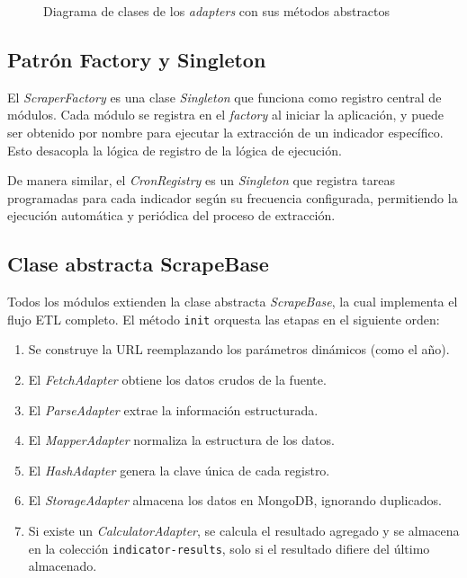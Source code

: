 \documentclass[12pt,letterpaper,oneside]{report}
\begin{document}
\begin{figure}[H]
  \caption{Diagrama de clases de los \textit{adapters} con sus m\'etodos abstractos}
  \label{fig:diagrama-adapters}
\end{figure}

\subsection{Patr\'on Factory y Singleton}
\label{sec:patron-factory}

El \textit{ScraperFactory} es una clase \textit{Singleton} que funciona como registro central de m\'odulos. Cada m\'odulo se registra en el \textit{factory} al iniciar la aplicaci\'on, y puede ser obtenido por nombre para ejecutar la extracci\'on de un indicador espec\'ifico. Esto desacopla la l\'ogica de registro de la l\'ogica de ejecuci\'on.

De manera similar, el \textit{CronRegistry} es un \textit{Singleton} que registra tareas programadas para cada indicador seg\'un su frecuencia configurada, permitiendo la ejecuci\'on autom\'atica y peri\'odica del proceso de extracci\'on.

\subsection{Clase abstracta ScrapeBase}
\label{sec:scrape-base}

Todos los m\'odulos extienden la clase abstracta \textit{ScrapeBase}, la cual implementa el flujo ETL completo. El m\'etodo \texttt{init} orquesta las etapas en el siguiente orden:

\begin{enumerate}
  \item Se construye la URL reemplazando los par\'ametros din\'amicos (como el a\~no).
  \item El \textit{FetchAdapter} obtiene los datos crudos de la fuente.
  \item El \textit{ParseAdapter} extrae la informaci\'on estructurada.
  \item El \textit{MapperAdapter} normaliza la estructura de los datos.
  \item El \textit{HashAdapter} genera la clave \'unica de cada registro.
  \item El \textit{StorageAdapter} almacena los datos en MongoDB, ignorando duplicados.
  \item Si existe un \textit{CalculatorAdapter}, se calcula el resultado agregado y se almacena en la colecci\'on \texttt{indicator-results}, solo si el resultado difiere del \'ultimo almacenado.
\end{enumerate}
\end{document}
